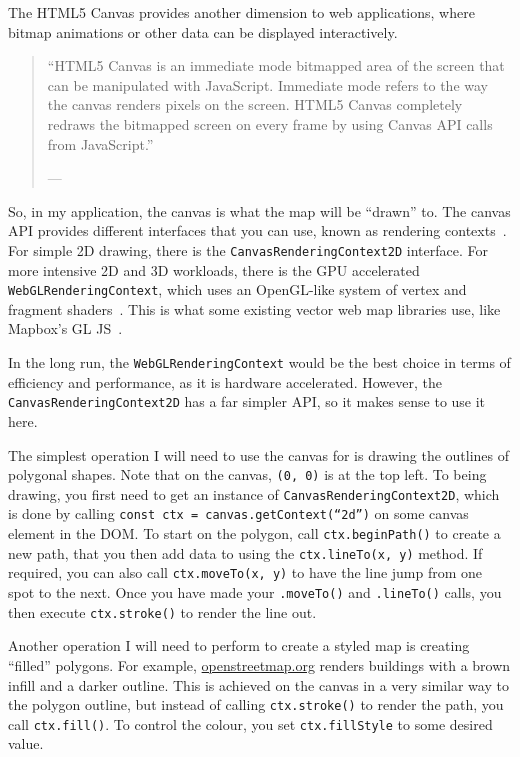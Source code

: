 The HTML5 Canvas provides another dimension to web applications, where bitmap animations or other data can be displayed interactively.

\begin{quote}
    ``HTML5 Canvas is an immediate mode bitmapped area of the screen that can be manipulated with JavaScript. Immediate mode refers to the way the canvas renders pixels on the screen. HTML5 Canvas completely redraws the bitmapped screen on every frame by using Canvas API calls from JavaScript.''

    \footnotesize{--- }
\end{quote}

So, in my application, the canvas is what the map will be ``drawn'' to. The canvas API provides different interfaces that you can use, known as rendering contexts~\cite{mdn-canvas-api}. For simple 2D drawing, there is the \texttt{CanvasRenderingContext2D} interface. For more intensive 2D and 3D workloads, there is the GPU accelerated \texttt{WebGLRenderingContext}, which uses an OpenGL-like system of vertex and fragment shaders~\cite{mdn-web-gl}. This is what some existing vector web map libraries use, like Mapbox's GL JS~\cite{mapbox-gl-js}.

In the long run, the \texttt{WebGLRenderingContext} would be the best choice in terms of efficiency and performance, as it is hardware accelerated. However, the \texttt{Canvas\-Rendering\-Context2D} has a far simpler API, so it makes sense to use it here.

The simplest operation I will need to use the canvas for is drawing the outlines of polygonal shapes. Note that on the canvas, \texttt{(0, 0)} is at the top left. To being drawing, you first need to get an instance of \texttt{Canvas\-Rendering\-Context2D}, which is done by calling \texttt{const ctx = canvas.getContext(``2d'')} on some canvas element in the DOM\@. To start on the polygon, call \texttt{ctx.beginPath()} to create a new path, that you then add data to using the \texttt{ctx.lineTo(x, y)} method. If required, you can also call \texttt{ctx.moveTo(x, y)} to have the line jump from one spot to the next. Once you have made your \texttt{.moveTo()} and \texttt{.lineTo()} calls, you then execute \texttt{ctx.stroke()} to render the line out.

Another operation I will need to perform to create a styled map is creating ``filled'' polygons. For example, \href{https://openstreetmap.org}{openstreetmap.org} renders buildings with a brown infill and a darker outline. This is achieved on the canvas in a very similar way to the polygon outline, but instead of calling \texttt{ctx.stroke()} to render the path, you call \texttt{ctx.fill()}. To control the colour, you set \texttt{ctx.fillStyle} to some desired value.

